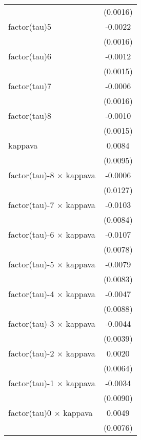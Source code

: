 \begin{tabular}{lc}
                                   & (0.0016)\\   
   factor(tau)5                    & -0.0022\\   
                                   & (0.0016)\\   
   factor(tau)6                    & -0.0012\\   
                                   & (0.0015)\\   
   factor(tau)7                    & -0.0006\\   
                                   & (0.0016)\\   
   factor(tau)8                    & -0.0010\\   
                                   & (0.0015)\\   
   kappava                         & 0.0084\\   
                                   & (0.0095)\\   
   factor(tau)-8 $\times$ kappava  & -0.0006\\   
                                   & (0.0127)\\   
   factor(tau)-7 $\times$ kappava  & -0.0103\\   
                                   & (0.0084)\\   
   factor(tau)-6 $\times$ kappava  & -0.0107\\   
                                   & (0.0078)\\   
   factor(tau)-5 $\times$ kappava  & -0.0079\\   
                                   & (0.0083)\\   
   factor(tau)-4 $\times$ kappava  & -0.0047\\   
                                   & (0.0088)\\   
   factor(tau)-3 $\times$ kappava  & -0.0044\\   
                                   & (0.0039)\\   
   factor(tau)-2 $\times$ kappava  & 0.0020\\   
                                   & (0.0064)\\   
   factor(tau)-1 $\times$ kappava  & -0.0034\\   
                                   & (0.0090)\\   
   factor(tau)0 $\times$ kappava   & 0.0049\\   
                                   & (0.0076)\\   

\end{tabular}
